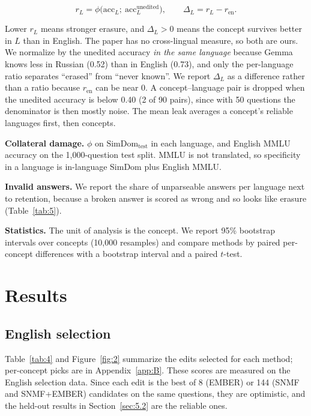 \documentclass[11pt]{article}
\begin{document}
\begin{equation*}
r_L=\phi\big(\mathrm{acc}_L;\ \mathrm{acc}^{\text{unedited}}_L\big),\qquad \Delta_L=r_L-r_{\text{en}}.
\end{equation*}

Lower $r_L$ means stronger erasure, and $\Delta_L>0$ means the concept survives better in $L$ than in English. The paper has no cross-lingual measure, so both are ours. We normalize by the unedited accuracy \emph{in the same language} because Gemma knows less in Russian (0.52) than in English (0.73), and only the per-language ratio separates ``erased'' from ``never known''. We report $\Delta_L$ as a difference rather than a ratio because $r_{\text{en}}$ can be near 0. A concept--language pair is dropped when the unedited accuracy is below 0.40 (2 of 90 pairs), since with 50 questions the denominator is then mostly noise. The mean leak averages a concept's reliable languages first, then concepts.

\textbf{Collateral damage.} $\phi$ on $\text{SimDom}_{\text{test}}$ in each language, and English MMLU accuracy on the 1,000-question test split. MMLU is not translated, so specificity in a language is in-language SimDom plus English MMLU.

\textbf{Invalid answers.} We report the share of unparseable answers per language next to retention, because a broken answer is scored as wrong and so looks like erasure (Table~\ref{tab:5}).

\textbf{Statistics.} The unit of analysis is the concept. We report 95\% bootstrap intervals over concepts (10,000 resamples) and compare methods by paired per-concept differences with a bootstrap interval and a paired $t$-test.

\section{Results}\label{sec:5}

\subsection{English selection}\label{sec:5.1}

Table~\ref{tab:4} and Figure~\ref{fig:2} summarize the edits selected for each method; per-concept picks are in Appendix~\ref{app:B}. These scores are measured on the English selection data. Since each edit is the best of 8 (EMBER) or 144 (SNMF and SNMF+EMBER) candidates on the same questions, they are optimistic, and the held-out results in Section~\ref{sec:5.2} are the reliable ones.
\end{document}

